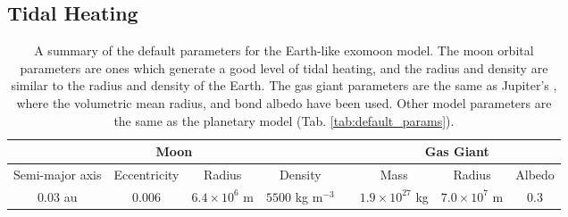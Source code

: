 \documentclass[12pt, onecolumn]{revtex4-2}    %
\begin{document}
\subsection{Tidal Heating} \label{ssec:TidalHeating}
%
\begin{table*}
  \begin{tabular}{|c|c|c|c|c|c|c|c|}
    \hline
    \multicolumn{4}{|c|}{Moon} && \multicolumn{3}{c|}{Gas Giant} \\
    \hline
    Semi-major axis & Eccentricity & Radius & Density && Mass & Radius & Albedo \\
    \hline
    $0.03$ au & $0.006$ & $6.4\times 10^6$ m & $5500$ kg m$^{-3}$ && $1.9\times10^{27}$ kg & $7.0 \times 10^7$ m & 0.3 \\
    \hline
  \end{tabular}
  \caption{
    A summary of the default parameters for the Earth-like exomoon model.
    The moon orbital parameters are ones which generate a good level of tidal heating,
    and the radius and density are similar to the radius and density of the Earth.
    The gas giant parameters are the same as Jupiter's \cite{NASA_jupiter}, where the volumetric mean radius, and bond albedo have been used.
    Other model parameters are the same as the planetary model (Tab. \ref{tab:default_params}).
  }
  \label{tab:default_params_moon}
\end{table*}

\end{document}
